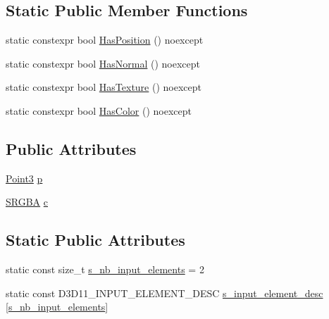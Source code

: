 \subsection*{Static Public Member Functions}
\begin{DoxyCompactItemize}
\item 
static constexpr bool \hyperlink{structmage_1_1_vertex_position_color_a254be63b468600a4a60639644d34086b}{Has\+Position} () noexcept
\item 
static constexpr bool \hyperlink{structmage_1_1_vertex_position_color_a53289aa86f3de21ba083d33dd18fafb8}{Has\+Normal} () noexcept
\item 
static constexpr bool \hyperlink{structmage_1_1_vertex_position_color_a34d7619b86890e49bd7678d333a50eef}{Has\+Texture} () noexcept
\item 
static constexpr bool \hyperlink{structmage_1_1_vertex_position_color_ae009d24a1a0fe1b60be9139c8ea62e5c}{Has\+Color} () noexcept
\end{DoxyCompactItemize}
\subsection*{Public Attributes}
\begin{DoxyCompactItemize}
\item 
\hyperlink{structmage_1_1_point3}{Point3} \hyperlink{structmage_1_1_vertex_position_color_afe40a78afb8e13e742d93d5092b1a614}{p}
\item 
\hyperlink{structmage_1_1_s_r_g_b_a}{S\+R\+G\+BA} \hyperlink{structmage_1_1_vertex_position_color_a18b969637a84ba42f99fd2c54cfc779a}{c}
\end{DoxyCompactItemize}
\subsection*{Static Public Attributes}
\begin{DoxyCompactItemize}
\item 
static const size\+\_\+t \hyperlink{structmage_1_1_vertex_position_color_ab59f4ce0c11158a904232371f8f7bbd1}{s\+\_\+nb\+\_\+input\+\_\+elements} = 2
\item 
static const D3\+D11\+\_\+\+I\+N\+P\+U\+T\+\_\+\+E\+L\+E\+M\+E\+N\+T\+\_\+\+D\+E\+SC \hyperlink{structmage_1_1_vertex_position_color_a0cc09950718850b64339c5fd5130ff9a}{s\+\_\+input\+\_\+element\+\_\+desc} \mbox{[}\hyperlink{structmage_1_1_vertex_position_color_ab59f4ce0c11158a904232371f8f7bbd1}{s\+\_\+nb\+\_\+input\+\_\+elements}\mbox{]}
\end{DoxyCompactItemize}


